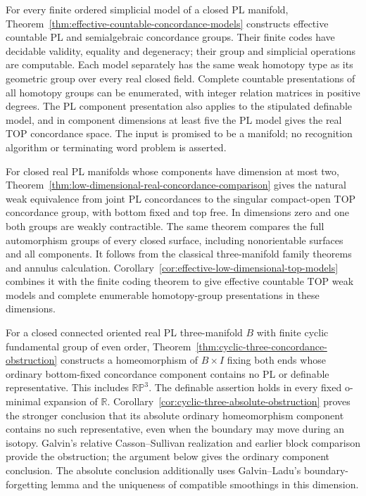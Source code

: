 \documentclass[11pt,a4paper]{article}
\theoremstyle{definition}
\begin{document}
For every finite ordered simplicial model of a closed PL manifold,
Theorem~\ref{thm:effective-countable-concordance-models} constructs
effective countable PL and semialgebraic concordance groups. Their
finite codes have decidable validity, equality and degeneracy; their
group and simplicial operations are computable. Each model separately
has the same weak homotopy type as its geometric group over every
real closed field. Complete countable presentations of all homotopy
groups can be enumerated, with integer relation matrices in positive
degrees. The PL component presentation also applies to the stipulated
definable model, and in component dimensions at least five the PL
model gives the real TOP concordance space. The input is promised to
be a manifold; no recognition algorithm or terminating word problem
is asserted.

For closed real PL manifolds whose components have dimension at most
two, Theorem~\ref{thm:low-dimensional-real-concordance-comparison}
gives the natural weak equivalence from joint PL concordances to the
singular compact-open TOP concordance group, with bottom fixed and top
free. In dimensions zero and one both groups are weakly contractible.
The same theorem compares the full automorphism groups of every closed
surface, including nonorientable surfaces and all components. It follows
from the classical three-manifold family theorems and annulus calculation.
Corollary~\ref{cor:effective-low-dimensional-top-models} combines it with
the finite coding theorem to give effective countable TOP weak models
and complete enumerable homotopy-group presentations in these dimensions.

For a closed connected oriented real PL three-manifold $B$ with
finite cyclic fundamental group of even order,
Theorem~\ref{thm:cyclic-three-concordance-obstruction} constructs a
homeomorphism of $B\times I$ fixing both ends whose ordinary
bottom-fixed concordance component contains no PL or definable
representative. This includes $\mathbb {RP}^3$. The definable
assertion holds in every fixed o-minimal expansion of $\mathbb R$.
Corollary~\ref{cor:cyclic-three-absolute-obstruction} proves the
stronger conclusion that its absolute ordinary homeomorphism
component contains no such representative, even when the boundary
may move during an isotopy. Galvin's relative Casson--Sullivan
realization and earlier block comparison
\cite[Section~4.2 and p.~2528]{Galvin2026CassonSullivan}
\cite[Chapter~9, pp.~109--117]{GalvinThesis2024}
provide the obstruction; the argument below gives the ordinary
component conclusion. The absolute conclusion additionally uses
Galvin--Ladu's boundary-forgetting lemma
\cite[Lemma~5.3, pp.~17--18]{GalvinLadu2025Boundary}
and the uniqueness of compatible smoothings in this dimension.
\end{document}
